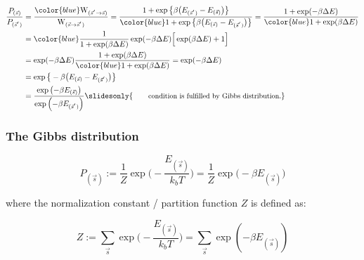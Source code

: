 \begin{frame}{\subsecname}
\begin{align}
	\frac{P_{(\vec{s})}}{P_{(\vec{s}^{'})}}
	& = \frac{{\color{blue}\mathrm{W}_{(\vec{s}^{'} \rightarrow \vec{s})}}}{
		\mathrm{W}_{(\vec{s} \rightarrow \vec{s}^{'})}} 
	= \frac{1 + \exp\big\{ \beta \big( E_{(\vec{s}^{'})} - E_{(\vec{s})}
		\big) \big\} }{{\color{blue}1 + \exp\big\{ \beta \big( E_{(\vec{s})} - 
		E_{(\vec{s}^{'})}\big) \big\} } }
	= \frac{1 + \exp( -\beta \Delta E)}{{\color{blue}1 + \exp( \beta \Delta E)}}  \\
	&= {\color{blue}\frac{1}{1+\exp(\beta \Delta E)}} \exp(-\beta \Delta E)
	\Big\lbrack \exp(\beta \Delta E) + 1\Big\rbrack\\
	&= \exp(-\beta \Delta E) \frac{1+\exp(\beta \Delta E)}{{\color{blue}1+\exp(\beta \Delta E)}}
	= \exp( - \beta \Delta E ) \\
	& = \exp\big\{ -\beta \big( E_{(\vec{s})} - E_{(\vec{s}^{'})}\big) \big\}\\
	&= \frac{\exp\left( -\beta E_{(\vec{s})}\right)}{\exp\left( -\beta  E_{(\vec{s}^{'})} \right)}
    \slidesonly{
    \qquad \small \text{condition is fulfilled by Gibbs distribution.}
    }
\end{align}

\end{frame}
\begin{frame}\frametitle{The Gibbs distribution}
\begin{equation}  \label{eq:gibbs}
P_{(\vec{s})} := \frac{1}{Z} \exp \Big(-\frac{E_{(\vec s)}}{k_b T}\Big) 
= \frac{1}{Z} \exp \Big(-\beta E_{(\vec s)} \Big) 
\end{equation}

where the normalization constant / partition function $Z$ is defined as:


\begin{equation} \label{eq:partition}
Z := \sum\limits_{\vec{s}} \exp \Big(-\frac{E_{(\vec s)}}{k_b T}\Big) = \sum\limits_{\vec{s}} \exp(-\beta E_{(\vec s)})
\end{equation}


\end{frame}

